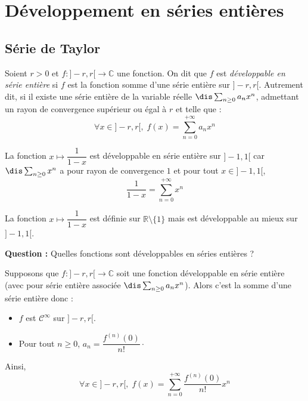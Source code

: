 \documentclass[a4paper,10pt]{report}
\begin{document}
\section{Développement en séries entières}
\subsection{Série de Taylor}

\begin{defin}
Soient $r>0$ et $f : ]-r,r[ \rightarrow \mathbb{C}$ une fonction. On dit que $f$ est \textit{développable en série entière} si $f$ est la fonction somme d'une série entière sur $]-r,r[$. Autrement dit, si il existe une série entière de la variable réelle $\dis \sum_{n \geq 0} a_n x^n$, admettant un rayon de convergence supérieur ou égal à $r$ et telle que :
$$ \forall x \in ]-r,r[, \; f(x) = \sum_{n=0}^{+ \infty} a_n x^n$$
\end{defin}

\begin{ex} La fonction $x \mapsto \dfrac{1}{1-x}$ est développable en série entière sur $]-1,1[$ car $\dis \sum_{n \geq 0} x^n$ a pour rayon de convergence $1$ et pour tout $x \in ]-1,1[$,
$$ \frac{1}{1-x}= \sum_{n=0}^{+ \infty} x^n$$
\end{ex}

\begin{att} La fonction $x \mapsto \dfrac{1}{1-x}$ est définie sur $\mathbb{R} \setminus \lbrace 1 \rbrace$ mais est développable au mieux sur $]-1,1[$.
\end{att}

\medskip

\noindent \textbf{Question :} Quelles fonctions sont développables en séries entières ?

\medskip

\noindent Supposons que $f : ]-r,r[ \rightarrow \mathbb{C}$ soit une fonction développable en série entière (avec pour série entière associée $\dis \sum_{n \geq 0} a_n x^n$). Alors c'est la somme d'une série entière donc :
\begin{itemize}
\item $f$ est $\mathcal{C}^{\infty}$ sur $]-r,r[$.
\item Pour tout $n \geq 0$, $a_n = \dfrac{f^{(n)}(0)}{n!} \cdot$
\end{itemize}
Ainsi,
$$ \forall x \in ]-r,r[, \; f(x)= \sum_{n=0}^{+ \infty} \dfrac{f^{(n)}(0)}{n!}  x^n$$

\medskip
\end{document}
